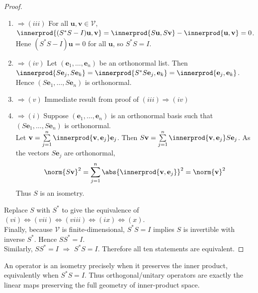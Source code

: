 \begin{theorem}
\begin{proof}
\begin{enumerate}[label=\roman*.]
as $S$ preserves norms. Hence $S$ also preserves inner products.
\item[$(ii)$]$\Rightarrow (iii)$ For all $\mathbf{u}, \mathbf{v} \in \mathcal{V}$, $\innerprod{(S^* S - I)\mathbf{u}, \mathbf{v}} = \innerprod{S \mathbf{u}, S \mathbf{v}} - \innerprod{\mathbf{u}, \mathbf{v}} = 0$.\\
Hene $(S^* S - I)\mathbf{u} = 0$ for all $\mathbf{u}$, so $S^* S = I$.
\item[$(iii)$]$\Rightarrow (iv)$ Let $(\mathbf{e}_1, \ldots, \mathbf{e}_n)$ be an orthonormal list. Then $\innerprod{S \mathbf{e}_j, S \mathbf{e}_k} = \innerprod{S^* S \mathbf{e}_j, \mathbf{e}_k} = \innerprod{\mathbf{e}_j, \mathbf{e}_k}$.\\
Hence $(S\mathbf{e}_1, \ldots, S\mathbf{e}_n)$ is orthonormal.
\item[$(iv)$]$\Rightarrow (v)$ Immediate result from proof of $(iii) \Rightarrow (iv)$
\item[$(v)$]$\Rightarrow (i)$ Suppose $(\mathbf{e}_1, \ldots, \mathbf{e}_n)$ is an orthonormal basis such that $(S\mathbf{e}_1, \ldots, S\mathbf{e}_n)$ is orthonormal.\\
Let $\mathbf{v} = \sum\limits_{j=1}^n \innerprod{\mathbf{v}, \mathbf{e}_j} \mathbf{e}_j$. Then $S \mathbf{v} = \sum\limits_{j=1}^n \innerprod{\mathbf{v}, \mathbf{e}_j} S \mathbf{e}_j$. As the vectors $S \mathbf{e}_j$ are orthonormal, 
\begin{align}
\norm{S \mathbf{v}}^2 = \sum\limits_{j=1}^n \abs{\innerprod{\mathbf{v}, \mathbf{e}_j}}^2 = \norm{\mathbf{v}}^2 \nonumber
\end{align}
Thus $S$ is an isometry.
\end{enumerate}
\hfill \break
Replace $S$ with $S^*$ to give the equivalence of $(vi) \Leftrightarrow (vii) \Leftrightarrow (viii) \Leftrightarrow (ix) \Leftrightarrow (x)$.\\
Finally, because $\mathcal{V}$ is finite-dimensional, $S^* S = I$ implies $S$ is invertible with inverse $S^*$. Hence $S S^* = I$.\\
Similarly, $SS^* = I$ $\Rightarrow$ $S^* S = I$. Therefore all ten statements are equivalent.
\end{proof}
\end{theorem}

An operator is an isometry precisely when it preserves the inner product, equivalently when $S^*S = I$. Thus orthogonal/unitary operators are exactly the linear maps preserving the full geometry of inner-product space.

